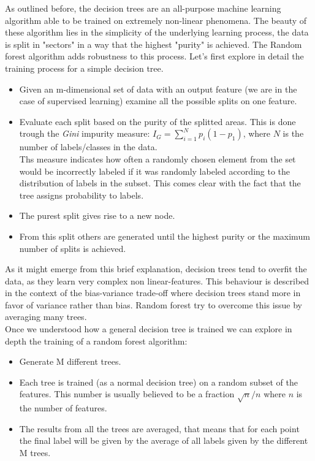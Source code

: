 \documentclass[12pt]{article} %
\numberwithin{equation}{subsection}
\begin{document}
As outlined before, the decision trees are an all-purpose machine learning algorithm able to be trained on extremely non-linear phenomena. The beauty of these algorithm lies in the simplicity of the underlying learning process, the data is split in "sectors" in a way that the highest "purity" is achieved. The Random forest algorithm adds robustness to this process. Let's first explore in detail the training process for a simple decision tree.\\

\begin{itemize}
	\item  Given an m-dimensional set of data with an output feature (we are in the case of supervised learning) examine all the possible splits on one feature.
	\item Evaluate each split based on the purity of the splitted areas. This is done trough the \textit{Gini} impurity measure: $I_G = \sum\limits_{i=1}^N p_i(1-p_1)$, where $N$ is the number of labels/classes in the data.\\
	Ths measure indicates how often a randomly chosen element from the set would be incorrectly labeled if it was randomly labeled according to the distribution of labels in the subset. This comes clear with the fact that the tree assigns probability to labels.
	\item The purest split gives rise to a new node.
	\item From this split others are generated until the highest purity or the maximum number of splits is achieved.\\
\end{itemize}

As it might emerge from this brief explanation, decision trees tend to overfit the data, as they learn very complex non linear-features. This behaviour is described in the context of the bias-variance trade-off where decision trees stand more in favor of variance rather than bias. Random forest try to overcome this issue by averaging many trees.\\
Once we understood how a general decision tree is trained we can explore in depth the training of a random forest algorithm:

\begin{itemize}
	\item Generate M different trees.
	\item Each tree is trained (as a normal decision tree) on a random subset of the features. This number is usually believed to be a fraction $\sqrt{n}/n$ where $n$ is the number of features.
	\item The results from all the trees are averaged, that means that for each point the final label will be given by the average of all labels given by the different M trees. 
\end{itemize}
\end{document}
